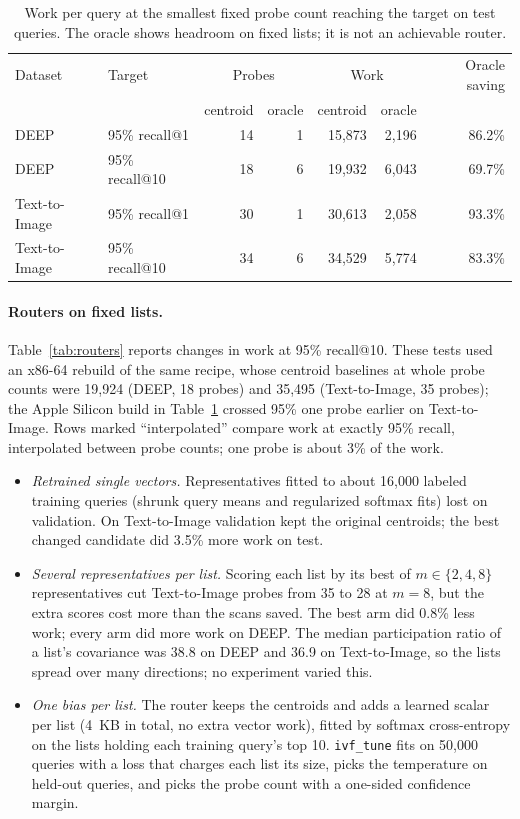 \documentclass[11pt]{article}
\theoremstyle{definition}
\theoremstyle{remark}
\begin{document}
\begin{table}[t]
\centering
\caption{Work per query at the smallest fixed probe count reaching the target on test queries. The oracle shows headroom on fixed lists; it is not an achievable router.}\label{tab:oracle}
\begin{tabular}{llrrrrr}
\toprule
Dataset & Target & \multicolumn{2}{c}{Probes} & \multicolumn{2}{c}{Work} & Oracle saving\\
 & & centroid & oracle & centroid & oracle & \\
\midrule
DEEP & 95\% recall@1 & 14 & 1 & 15{,}873 & 2{,}196 & 86.2\%\\
DEEP & 95\% recall@10 & 18 & 6 & 19{,}932 & 6{,}043 & 69.7\%\\
Text-to-Image & 95\% recall@1 & 30 & 1 & 30{,}613 & 2{,}058 & 93.3\%\\
Text-to-Image & 95\% recall@10 & 34 & 6 & 34{,}529 & 5{,}774 & 83.3\%\\
\bottomrule
\end{tabular}
\end{table}

\paragraph{Routers on fixed lists.} Table~\ref{tab:routers} reports changes in work at 95\% recall@10. These tests used an x86-64 rebuild of the same recipe, whose centroid baselines at whole probe counts were 19,924 (DEEP, 18 probes) and 35,495 (Text-to-Image, 35 probes); the Apple Silicon build in Table~\ref{tab:oracle} crossed 95\% one probe earlier on Text-to-Image. Rows marked ``interpolated'' compare work at exactly 95\% recall, interpolated between probe counts; one probe is about 3\% of the work.

\begin{itemize}
\item \emph{Retrained single vectors.} Representatives fitted to about 16,000 labeled training queries (shrunk query means and regularized softmax fits) lost on validation. On Text-to-Image validation kept the original centroids; the best changed candidate did 3.5\% more work on test.
\item \emph{Several representatives per list.} Scoring each list by its best of $m\in\{2,4,8\}$ representatives cut Text-to-Image probes from 35 to 28 at $m=8$, but the extra scores cost more than the scans saved. The best arm did 0.8\% less work; every arm did more work on DEEP. The median participation ratio of a list's covariance was 38.8 on DEEP and 36.9 on Text-to-Image, so the lists spread over many directions; no experiment varied this.
\item \emph{One bias per list.} The router keeps the centroids and adds a learned scalar per list (4~KB in total, no extra vector work), fitted by softmax cross-entropy on the lists holding each training query's top 10. \texttt{ivf\_tune} fits on 50,000 queries with a loss that charges each list its size, picks the temperature on held-out queries, and picks the probe count with a one-sided confidence margin.
\end{itemize}
\end{document}
